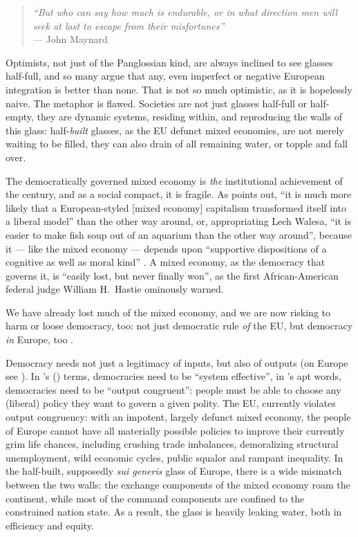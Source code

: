 \begin{quote}
	\emph{``But who can say how much is endurable, or in what direction men will seek at last to escape from their misfortunes''}\\
	--- John Maynard \cite{Keynes1936}
\end{quote}

Optimists, not just of the Panglossian kind, are always inclined to see glasses half-full, and so many argue that any, even imperfect or negative European integration is better than none.
 That is not so much optimistic, as it is hopelessly naive.
The metaphor is flawed.
Societies are not just glasses half-full or half-empty, they are dynamic systems, residing within, and reproducing the walls of this glass:
half-\emph{built} glasses, as the \gls{EU} defunct mixed economies, are not merely waiting to be filled, they can also drain of all remaining water, or topple and fall over.

The democratically governed mixed economy is \emph{the} institutional achievement of the century, and as a social compact, it is fragile.
As \citeauthor{Offe2003} points out, ``it is much more likely that a European-styled [mixed economy] capitalism transformed itself into a liberal model'' than the other way around, or, appropriating Lech Walesa, ``it is easier to make fish soup out of an aquarium than the other way around'', because it --- like the mixed economy --- depends upon ``supportive dispositions of a cognitive as well as moral kind'' \citeyearpar[446]{Offe2003}.
A mixed economy, as the democracy that governs it, is ``easily lost, but never finally won'', as the first African-American federal judge William H.~Hastie ominously warned.

We have already lost much of the mixed economy, and we are now risking to harm or loose democracy, too:
not just democratic rule \emph{of} the \gls{EU}, but democracy \emph{in} Europe, too \citep[19]{Scharpf1997}.

Democracy needs not just a legitimacy of inputs, but also of outputs (on Europe see \citealt{SchaGove1999}).
In \citeauthor{Dahl-1994-ab}'s (\citeyear{Dahl-1994-ab}) terms, democracies need to be ``system effective'', in \citeauthor{Zurn-2000-aa}'s \citeyearpar{Zurn-2000-aa} apt words, democracies need to be ``output congruent'':
people must be able to choose any (liberal) policy they want to govern a given polity.
The \gls{EU}, currently violates output congruency:
with an impotent, largely defunct mixed economy, the people of Europe cannot have all materially possible policies to improve their currently grim life chances, including crushing trade imbalances, demoralizing structural unemployment, wild economic cycles, public squalor and rampant inequality.
In the half-built, supposedly \emph{sui generis} glass of Europe, there is a wide mismatch between the two walls:
the exchange components of the mixed economy roam the continent, while most of the command components are confined to the constrained nation state.
As a result, the glass is heavily leaking water, both in efficiency and equity.

